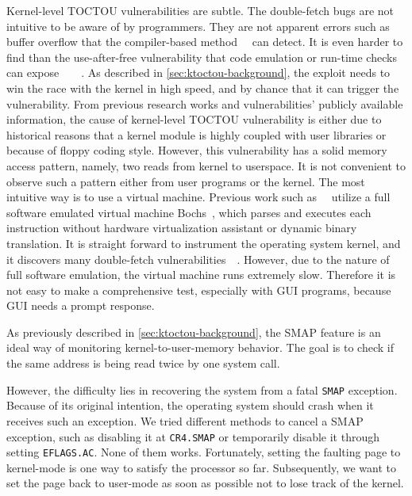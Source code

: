 Kernel-level TOCTOU vulnerabilities are subtle. The double-fetch bugs are not intuitive to be aware of by programmers. They are not apparent errors such as buffer overflow that the compiler-based method~\cite{nagarakatte2015everything}~\cite{zhang2010intpatch} can detect. It is even harder to find than the use-after-free vulnerability that code emulation or run-time checks can expose~\cite{feist2016finding}~\cite{chen2020savior}~\cite{lee2015preventing}~\cite{serebryany2012addresssanitizer}. As described in \autoref{sec:ktoctou-background}, the exploit needs to win the race with the kernel in high speed, and by chance that it can trigger the vulnerability. From previous research works and vulnerabilities' publicly available information, the cause of kernel-level TOCTOU vulnerability is either due to historical reasons that a kernel module is highly coupled with user libraries or because of floppy coding style. However, this vulnerability has a solid memory access pattern, namely, two reads from kernel to userspace. It is not convenient to observe such a pattern either from user programs or the kernel. The most intuitive way is to use a virtual machine. Previous work such as~\cite{jurczyk2013identifying}~\cite{bochspwnreloaded} utilize a full software emulated virtual machine Bochs~\cite{lawton2003bochs}, which parses and executes each instruction without hardware virtualization assistant or dynamic binary translation.  It is straight forward to instrument the operating system kernel, and it discovers many double-fetch vulnerabilities~\cite{jurczyk2013identifying}~\cite{bochspwnreloaded}. However, due to the nature of full software emulation, the virtual machine runs extremely slow. Therefore it is not easy to make a comprehensive test, especially with GUI programs, because GUI needs a prompt response.

As previously described in \autoref{sec:ktoctou-background}, the SMAP feature is an ideal way of monitoring kernel-to-user-memory behavior. The goal is to check if the same address is being read twice by one system call. 

However, the difficulty lies in recovering the system from a fatal \texttt{SMAP} exception.  Because of its original intention, the operating system should crash when it receives such an exception. We tried different methods to cancel a SMAP exception, such as disabling it at \texttt{CR4.SMAP} or temporarily disable it through setting \texttt{EFLAGS.AC}. None of them works.  Fortunately, setting the faulting page to kernel-mode is one way to satisfy the processor so far. Subsequently, we want to set the page back to user-mode as soon as possible not to lose track of the kernel.

